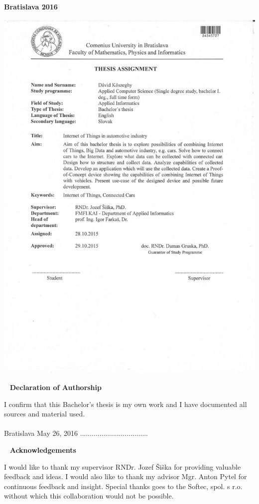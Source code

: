 
\vfill
\noindent
{\bf Bratislava 2016}  \hfill {\bf \autor}
\thispagestyle{empty}

\newpage
\thispagestyle{empty}
\vspace*{-35px}\hspace*{-30px}
\includegraphics[scale=0.50]{pics/zadanie.jpg}

\newpage
{~}\vfill
{\noindent \large\bf Declaration of Authorship} 
\vspace{1.5cm}

I confirm that this Bachelor’s thesis is my own work and I have documented all sources and material used.\\\\ 
Bratislava May 26, 2016
\hfill ................................... 
\vspace{1cm}

\newpage
{~}\vfill
{\noindent\large\bf Acknowledgements} 
\vspace{1.5cm}

I would like to thank my supervisor RNDr. Jozef Šiška for providing valuable feedback and ideas. I would also like to thank my advisor Mgr. Anton Pytel for continuous feedback and insight. Special thanks goes to the Softec, spol. s r.o. without which this collaboration would not be possible.
\vspace{1cm}

\newpage

